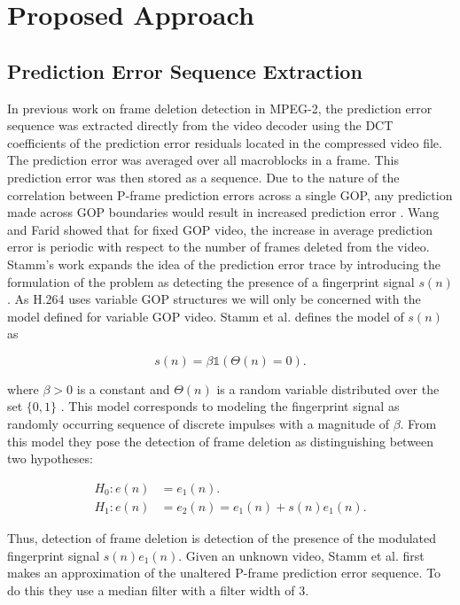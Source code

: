 \chapter{Proposed Approach}

\section{Prediction Error Sequence Extraction}

In previous work on frame deletion detection in MPEG-2, the prediction error sequence was extracted directly from the video decoder using the DCT coefficients of the prediction error residuals located in the compressed video file. The prediction error was averaged over all macroblocks in a frame. This prediction error was then stored as a sequence. Due to the nature of the correlation between P-frame prediction errors across a single GOP, any prediction made across GOP boundaries would result in increased prediction error \cite{wang}. Wang and Farid showed that for fixed GOP video, the increase in average prediction error is periodic with respect to the number of frames deleted from the video. Stamm's work expands the idea of the prediction error trace by introducing the formulation of the problem as detecting the presence of a fingerprint signal $s(n)$. As H.264 uses variable GOP structures we will only be concerned with the model defined for variable GOP video. Stamm et al. \cite{stamm} \cite{C} defines the model of $s(n)$ as

\begin{equation}
s(n) = \beta \mathds{1} \left( \Theta(n) = 0 \right).
\label{stammModel}
\end{equation}

where $\beta > 0$ is a constant and $\Theta(n)$ is a random variable distributed over the set $\{0, 1\}$ \cite{stamm}. This model corresponds to modeling the fingerprint signal as randomly occurring sequence of discrete impulses with a magnitude of $\beta$. From this model they pose the detection of frame deletion as distinguishing between two hypotheses:

\begin{equation}
\begin{aligned}
  H_{0} : e(n) &= e_{1}(n). \\
  H_{1} : e(n) &= e_{2}(n) = e_{1}(n) + s(n)e_{1}(n).
\end{aligned}
\end{equation}

Thus, detection of frame deletion is detection of the presence of the modulated fingerprint signal $s(n)e_{1}(n)$. Given an unknown video, Stamm et al. first makes an approximation of the unaltered P-frame prediction error sequence. To do this they use a median filter with a filter width of 3.

